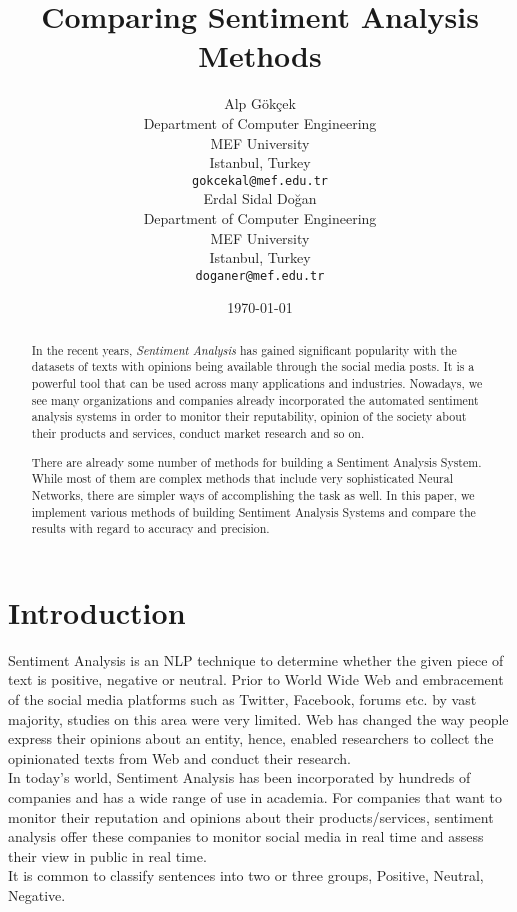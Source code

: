 \documentclass[11pt,a4paper]{article}
\title{Comparing Sentiment Analysis Methods}
\author{Alp Gökçek \\
  Department of Computer Engineering\\
  MEF University\\
  Istanbul, Turkey \\
  \texttt{gokcekal@mef.edu.tr} \\\And
  Erdal Sidal Doğan \\
  Department of Computer Engineering\\
  MEF University\\
  Istanbul, Turkey \\
  \texttt{doganer@mef.edu.tr} \\}
\date{\today}
\begin{document}
\maketitle
\begin{abstract}
In the recent years, \textit{Sentiment Analysis} has gained significant popularity with the datasets of texts with opinions being available through the social media posts. \cite{bing} It is a powerful tool that can be used across many applications and industries. Nowadays, we see many organizations and companies already incorporated the automated sentiment analysis systems in order to monitor their reputability, opinion of the society about their products and services, conduct market research and so on. \\ \par
There are already some number of methods for building a Sentiment Analysis System. While most of them are complex methods that include very sophisticated Neural Networks, there are simpler ways of accomplishing the task as well. In this paper, we implement various methods of building Sentiment Analysis Systems and compare the results with regard to accuracy and precision. 

\end{abstract}

\section{Introduction}
Sentiment Analysis is an NLP technique to determine whether the given piece of text is positive, negative or neutral. Prior to World Wide Web and embracement of the social media platforms such as Twitter, Facebook, forums etc. by vast majority, studies on this area were very limited. Web has changed the way people express their opinions about an entity, hence, enabled researchers to collect the opinionated texts from Web and conduct their research.\\

In today's world, Sentiment Analysis has been incorporated by hundreds of companies and has a wide range of use in academia. For companies that want to monitor their reputation and opinions about their products/services, sentiment analysis offer these companies to monitor social media in real time and assess their view in public in real time.\\

It is common to classify sentences into two or three groups, Positive, Neutral, Negative.
\end{document}
